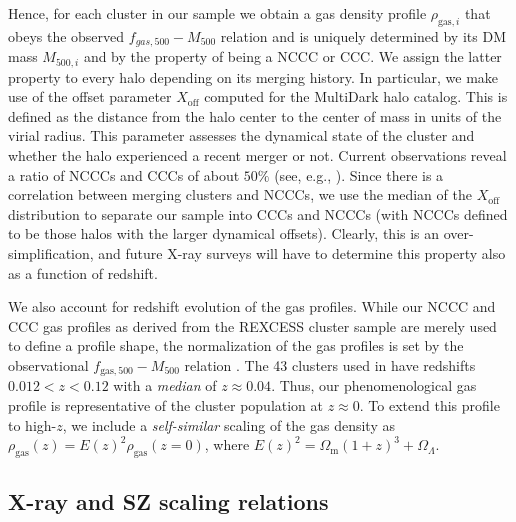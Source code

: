 \documentclass[traditabstract]{aa}
\newcommand{\rmn}{\mathrm}
\begin{document}
Hence, for each cluster in our sample we obtain a gas density profile
$\rho_{\rmn{gas},i}$ that obeys the observed $f_{gas,500}-M_{500}$ relation and
is uniquely determined by its DM mass $M_{500,i}$ and by the property of being a
NCCC or CCC. We assign the latter property to every halo depending on its
merging history. In particular, we make use of the offset parameter
$X_{\rmn{off}}$ computed for the MultiDark halo catalog. This is defined as the
distance from the halo center to the center of mass in units of the virial
radius. This parameter assesses the dynamical state of the cluster and whether
the halo experienced a recent merger or not. Current observations reveal a ratio
of NCCCs and CCCs of about $50\%$ (see, e.g., \citealp{2007A&A...466..805C,
  2009MNRAS.395..764S}). Since there is a correlation between merging clusters
and NCCCs, we use the median of the $X_{\rmn{off}}$ distribution to separate our
sample into CCCs and NCCCs (with NCCCs defined to be those halos with the larger
dynamical offsets). Clearly, this is an over-simplification, and future X-ray
surveys will have to determine this property also as a function of redshift.

We also account for redshift evolution of the gas profiles. While our NCCC and
CCC gas profiles as derived from the REXCESS cluster sample are merely used to
define a profile shape, the normalization of the gas profiles is set by the
observational $f_{\rmn{gas},500}-M_{500}$ relation \citep{2009ApJ...693.1142S}.
The 43 clusters used in \cite{2009ApJ...693.1142S} have redshifts $0.012 < z <
0.12$ with a \emph{median} of $z \approx 0.04$. Thus, our phenomenological gas
profile is representative of the cluster population at $z\approx0$. To extend this
profile to high-$z$, we include a \emph{self-similar} scaling of the gas density
as $\rho_{\rmn{gas}}(z) = E(z)^{2} \rho_{\rmn{gas}}(z=0)$, where $E(z)^{2} =
\Omega_{\rmn{m}} (1+z)^{3} + \Omega_{{\Lambda}}$.


\subsection{X-ray and SZ scaling relations}
\label{sec:X-SZ-scaling}
\end{document}
